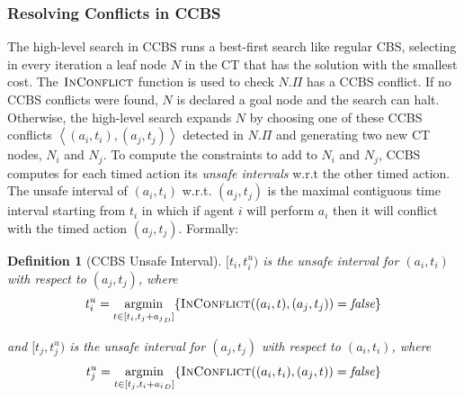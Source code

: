 \documentclass[review]{elsarticle}
\newtheorem{definition}{Definition}
\newcommand{\argmin}{\operatornamewithlimits{argmin}}
\newcommand{\tuple}[1]{\ensuremath{\left \langle #1 \right \rangle }}
\newcommand{\ccbs}{\ac{CCBS}\xspace}
\newcommand{\cbs}{\ac{CBS}\xspace}
\newcommand{\ct}{\ac{CT}\xspace}
\newcommand{\false}{\textit{false}\xspace}
\newcommand{\inconflict}{\textsc{InConflict}\xspace}
\begin{document}
\subsubsection{Resolving Conflicts in \ccbs}
The high-level search in \ccbs runs a best-first search like  regular \cbs, selecting in every iteration a leaf node $N$ in the \ct that has the solution with the smallest cost. 
The $\inconflict$ function is used to check $N.\Pi$ has a \ccbs conflict. If no \ccbs conflicts were found, $N$ is declared a goal node and the search can halt. Otherwise, the high-level search expands $N$ by choosing one of these \ccbs conflicts 
$\tuple{(a_i, t_i), (a_j, t_j)}$ detected in $N.\Pi$ and generating two new \ct nodes, $N_i$ and $N_j$. 
To compute the constraints to add to $N_i$ and $N_j$, \ccbs computes for each timed action its \emph{unsafe intervals} w.r.t the other timed action. 
The unsafe interval of $(a_i,t_i)$ w.r.t. $(a_j,t_j)$ is the maximal contiguous time interval starting from $t_i$ in which if agent $i$ will perform $a_i$ then it will conflict with the timed action $(a_j,t_j)$.  
Formally:
\begin{definition}[\ccbs Unsafe Interval]
$[t_i, t^u_i)$ is the unsafe interval for $(a_i,t_i)$ with respect to $(a_j,t_j)$, where
\begin{equation}
    t^u_i = 
    \argmin _{t\in [t_i, t_j + {a_j}_D]}
    \{ \inconflict ((a_i,t),
        (a_j,t_j)) = \false\}
        \label{eq:unsafei}
\end{equation}

and $[t_j, t^u_j)$ is the unsafe interval for 
$(a_j,t_j)$ with respect to $(a_i,t_i)$, where
\begin{equation}
    t^u_j = 
    \argmin _{t\in [t_j, t_i + {a_i}_D]}
    \{ \inconflict ((a_i,t_i),
        (a_j,t)) = \false\}
        \label{eq:unsafej}
\end{equation}

\label{def:unsafe-interval}
\end{definition}



\end{document}
